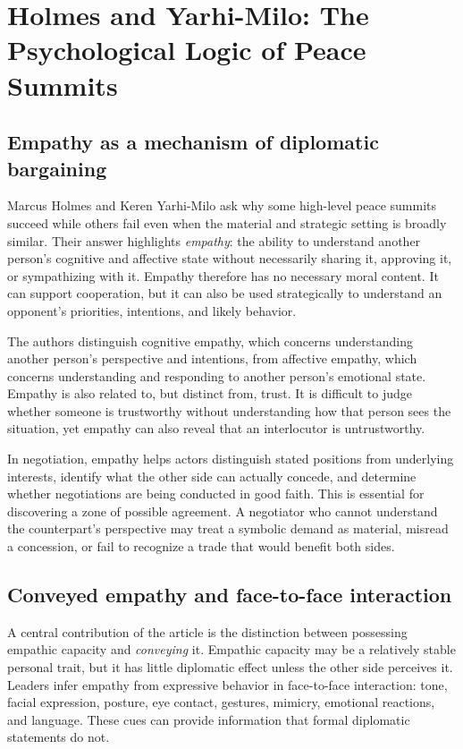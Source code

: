 
\clearpage
\section{Holmes and Yarhi-Milo: The Psychological Logic of Peace Summits}

\subsection{Empathy as a mechanism of diplomatic bargaining}

Marcus Holmes and Keren Yarhi-Milo ask why some high-level peace summits succeed while others fail even when the material and strategic setting is broadly similar. Their answer highlights \emph{empathy}: the ability to understand another person's cognitive and affective state without necessarily sharing it, approving it, or sympathizing with it. Empathy therefore has no necessary moral content. It can support cooperation, but it can also be used strategically to understand an opponent's priorities, intentions, and likely behavior.

The authors distinguish cognitive empathy, which concerns understanding another person's perspective and intentions, from affective empathy, which concerns understanding and responding to another person's emotional state. Empathy is also related to, but distinct from, trust. It is difficult to judge whether someone is trustworthy without understanding how that person sees the situation, yet empathy can also reveal that an interlocutor is untrustworthy.

In negotiation, empathy helps actors distinguish stated positions from underlying interests, identify what the other side can actually concede, and determine whether negotiations are being conducted in good faith. This is essential for discovering a zone of possible agreement. A negotiator who cannot understand the counterpart's perspective may treat a symbolic demand as material, misread a concession, or fail to recognize a trade that would benefit both sides.

\subsection{Conveyed empathy and face-to-face interaction}

A central contribution of the article is the distinction between possessing empathic capacity and \emph{conveying} it. Empathic capacity may be a relatively stable personal trait, but it has little diplomatic effect unless the other side perceives it. Leaders infer empathy from expressive behavior in face-to-face interaction: tone, facial expression, posture, eye contact, gestures, mimicry, emotional reactions, and language. These cues can provide information that formal diplomatic statements do not.

